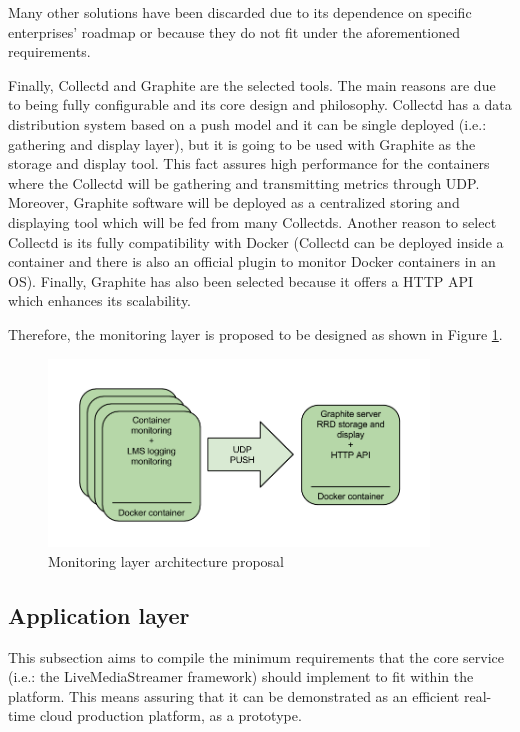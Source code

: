 Many other solutions have been discarded due to its dependence on specific enterprises' roadmap or because they do not fit under the aforementioned requirements.

Finally, Collectd and Graphite are the selected tools. The main reasons are due to being fully configurable and its core design and philosophy. Collectd has a data distribution system based on a push model and it can be single deployed (i.e.: gathering and display layer), but it is going to be used with Graphite as the storage and display tool. This fact assures high performance for the containers where the Collectd will be gathering and transmitting metrics through UDP. Moreover, Graphite software will be deployed as a centralized storing and displaying tool which will be fed from many Collectds. Another reason to select Collectd is its fully compatibility with Docker (Collectd can be deployed inside a container and there is also an official plugin to monitor Docker containers in an OS). Finally, Graphite has also been selected because it offers a HTTP API which enhances its scalability. 

Therefore, the monitoring layer is proposed to be designed as shown in Figure \ref{F:MLAP}.

\begin{figure}[htb]
\begin{center}
\includegraphics[width=0.9\textwidth]{./images/mlap.png}
\caption{Monitoring layer architecture proposal}
\label{F:MLAP}
\end{center}
\end{figure}

\subsection{Application layer}\label{B:appLayerCH2}

This subsection aims to compile the minimum requirements that the core service (i.e.: the LiveMediaStreamer framework) should implement to fit within the platform. This means assuring that it can be demonstrated as an efficient real-time cloud production platform, as a prototype.

